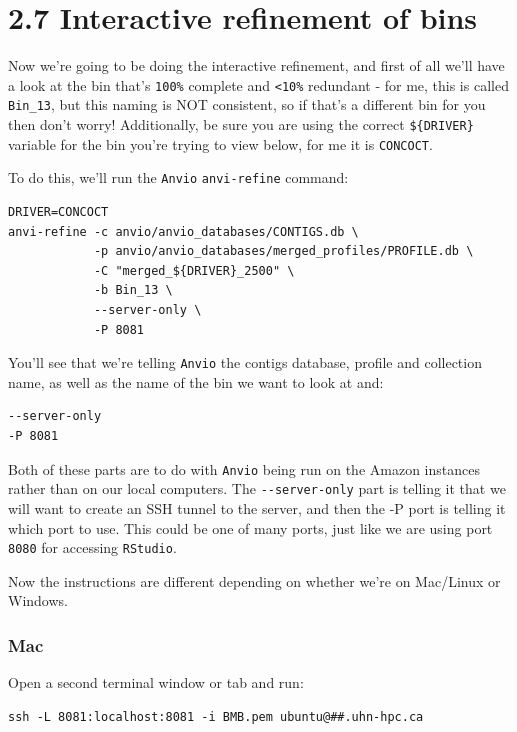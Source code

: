 \documentclass[
]{book}
\begin{document}
\section{2.7 Interactive refinement of bins}\label{interactive-refinement-of-bins}

Now we're going to be doing the interactive refinement, and first of all we'll have a look at the bin that's \texttt{100\%} complete and \texttt{\textless{}10\%} redundant - for me, this is called \texttt{Bin\_13}, but this naming is NOT consistent, so if that's a different bin for you then don't worry! Additionally, be sure you are using the correct \texttt{\$\{DRIVER\}} variable for the bin you're trying to view below, for me it is \texttt{CONCOCT}.

To do this, we'll run the \texttt{Anvi\textquotesingle{}o} \texttt{anvi-refine} command:

\begin{verbatim}
DRIVER=CONCOCT
anvi-refine -c anvio/anvio_databases/CONTIGS.db \
            -p anvio/anvio_databases/merged_profiles/PROFILE.db \
            -C "merged_${DRIVER}_2500" \
            -b Bin_13 \
            --server-only \
            -P 8081
\end{verbatim}

You'll see that we're telling \texttt{Anvi\textquotesingle{}o} the contigs database, profile and collection name, as well as the name of the bin we want to look at and:

\begin{verbatim}
--server-only
-P 8081
\end{verbatim}

Both of these parts are to do with \texttt{Anvi\textquotesingle{}o} being run on the Amazon instances rather than on our local computers. The \texttt{-\/-server-only} part is telling it that we will want to create an SSH tunnel to the server, and then the -P port is telling it which port to use. This could be one of many ports, just like we are using port \texttt{8080} for accessing \texttt{RStudio}.

Now the instructions are different depending on whether we're on Mac/Linux or Windows.

\subsubsection{Mac}\label{mac}

Open a second terminal window or tab and run:

\begin{verbatim}
ssh -L 8081:localhost:8081 -i BMB.pem ubuntu@##.uhn-hpc.ca
\end{verbatim}
\end{document}
